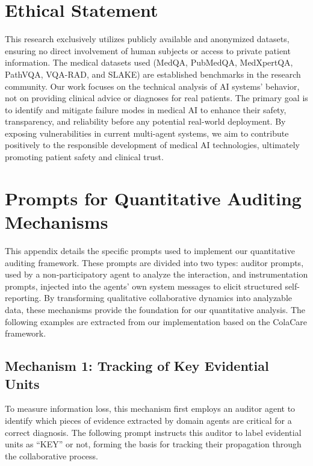 \documentclass{article}
\begin{document}



\appendix

\section{Ethical Statement}
\label{sec:appendix_ethics}
This research exclusively utilizes publicly available and anonymized datasets, ensuring no direct involvement of human subjects or access to private patient information. The medical datasets used (MedQA, PubMedQA, MedXpertQA, PathVQA, VQA-RAD, and SLAKE) are established benchmarks in the research community. Our work focuses on the technical analysis of AI systems' behavior, not on providing clinical advice or diagnoses for real patients. The primary goal is to identify and mitigate failure modes in medical AI to enhance their safety, transparency, and reliability before any potential real-world deployment. By exposing vulnerabilities in current multi-agent systems, we aim to contribute positively to the responsible development of medical AI technologies, ultimately promoting patient safety and clinical trust.

\section{Prompts for Quantitative Auditing Mechanisms}
\label{sec:appendix_prompts}

This appendix details the specific prompts used to implement our quantitative auditing framework. These prompts are divided into two types: auditor prompts, used by a non-participatory agent to analyze the interaction, and instrumentation prompts, injected into the agents' own system messages to elicit structured self-reporting. By transforming qualitative collaborative dynamics into analyzable data, these mechanisms provide the foundation for our quantitative analysis. The following examples are extracted from our implementation based on the ColaCare framework.

\subsection{Mechanism 1: Tracking of Key Evidential Units}

To measure information loss, this mechanism first employs an auditor agent to identify which pieces of evidence extracted by domain agents are critical for a correct diagnosis. The following prompt instructs this auditor to label evidential units as ``KEY'' or not, forming the basis for tracking their propagation through the collaborative process.
\end{document}
